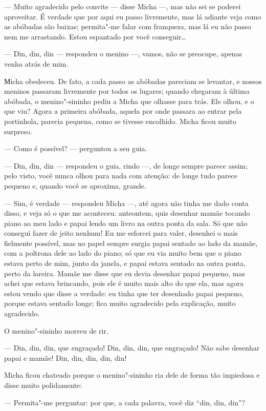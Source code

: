 --- Muito agradecido pelo convite --- disse Micha ---, mas não sei se
poderei aproveitar. É verdade que por aqui eu passo livremente, mas lá
adiante veja como as abóbadas são baixas; permita"-me falar com
franqueza, mas lá eu não passo nem me arrastando. Estou espantado por
você conseguir\ldots{}

--- Din, din, din --- respondeu o menino ---, vamos, não se preocupe,
apenas venha atrás de mim.

Мicha obedeceu. De fato, a cada passo as abóbadas pareciam se levantar,
e nossos meninos passaram livremente por todos os lugares; quando
chegaram à última abóbada, o menino"-sininho pediu a Micha que olhasse
para trás. Ele olhou, e o que viu? Agora a primeira abóbada, aquela por
onde passara ao entrar pela portinhola, parecia pequena, como se tivesse
encolhido. Micha ficou muito surpreso.

--- Como é possível? --- perguntou a seu guia.

--- Din, din, din --- respondeu o guia, rindo ---, de longe sempre
parece assim; pelo visto, você nunca olhou para nada com atenção: de
longe tudo parece pequeno e, quando você se aproxima, grande.

--- Sim, é verdade --- respondeu Micha ---, até agora não tinha me dado
conta disso, e veja só o que me aconteceu: anteontem, quis desenhar
mamãe tocando piano ao meu lado e papai lendo um livro na outra ponta da
sala. Só que não consegui fazer de jeito nenhum! Eu me esforcei para
valer, desenhei o mais fielmente possível, mas no papel sempre surgia
papai sentado ao lado da mamãe, com a poltrona dele ao lado do piano; só
que eu via muito bem que o piano estava perto de mim, junto da janela, e
papai estava sentado na outra ponta, perto da lareira. Mamãe me disse
que eu devia desenhar papai pequeno, mas achei que estava brincando,
pois ele é muito mais alto do que ela, mas agora estou vendo que disse a
verdade: eu tinha que ter desenhado papai pequeno, porque estava sentado
longe; fico muito agradecido pela explicação, muito agradecido.

O menino"-sininho morreu de rir.

--- Din, din, din, que engraçado! Din, din, din, que engraçado! Não sabe
desenhar papai e mamãe! Din, din, din, din, din!

Micha ficou chateado porque o menino"-sininho ria dele de forma tão
impiedosa e disse muito polidamente:

--- Permita"-me perguntar: por que, a cada palavra, você diz ``din, din,
din''?

